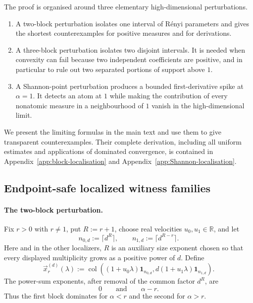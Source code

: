 \documentclass[aps,pra,11pt,onecolumn,nofootinbib,tightenlines]{revtex4-2}
\theoremstyle{definition}
\begin{document}
The proof is organised around three elementary high-dimensional perturbations.
\begin{enumerate}
 \item A two-block perturbation isolates one interval of R\'enyi parameters and gives the shortest counterexamples for positive measures and for derivations.
 \item A three-block perturbation isolates two disjoint intervals. It is needed when convexity can fail because two independent coefficients are positive, and in particular to rule out two separated portions of support above $1$.
 \item A Shannon-point perturbation produces a bounded first-derivative spike at $\alpha=1$. It detects an atom at $1$ while making the contribution of every nonatomic measure in a neighbourhood of $1$ vanish in the high-dimensional limit.
\end{enumerate}
We present the limiting formulas in the main text and use them to give transparent counterexamples. Their complete derivation, including all uniform estimates and applications of dominated convergence, is contained in Appendix~\ref{app:block-localisation} and Appendix~\ref{app:Shannon-localisation}.

\subsection{Endpoint-safe localized witness families}
\label{sec:localized-witnesses}

\paragraph{The two-block perturbation.}
Fix $r>0$ with $r\neq1$, put $R:=r+1$, choose real velocities
$u_0,u_1\in\mathbb R$, and let
\begin{equation}
 n_{0,d}:=\lceil d^R\rceil,
 \qquad
 n_{1,d}:=\lceil d^{R-r}\rceil.
 \label{eq:two-block-multiplicities-main}
\end{equation}
Here and in the other localizers, $R$ is an auxiliary size exponent chosen so
that every displayed multiplicity grows as a positive power of $d$.
Define
\begin{equation}
 \vec x_r^{(d)}(\lambda)
 :=\operatorname{col}\!\left(
   (1+u_0\lambda)\mathbf1_{n_{0,d}},
   d(1+u_1\lambda)\mathbf1_{n_{1,d}}
 \right).
 \label{eq:two-block-path-main}
\end{equation}
The power-sum exponents, after removal of the common factor $d^R$, are
\begin{equation}
 0
 \qquad\text{and}\qquad
 \alpha-r.
 \label{eq:two-block-exponents-main}
\end{equation}
Thus the first block dominates for $\alpha<r$ and the second for $\alpha>r$.
\end{document}
